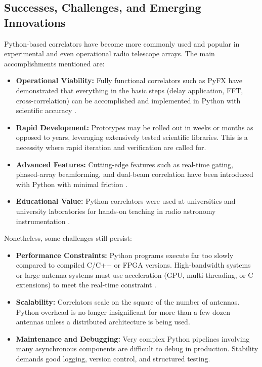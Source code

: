     \subsection{Successes, Challenges, and Emerging Innovations}
    Python-based correlators have become more commonly used and popular in experimental and even operational radio telescope arrays. The main accomplishments mentioned are:

    \begin{itemize}
        \item \textbf{Operational Viability:} Fully functional correlators such as PyFX have demonstrated that everything in the basic steps (delay application, FFT, cross-correlation) can be accomplished and implemented in Python with scientific accuracy \cite{Leung2024}.
        
        \item \textbf{Rapid Development:} Prototypes may be rolled out in weeks or months as opposed to years, leveraging extensively tested scientific libraries. This is a necessity where rapid iteration and verification are called for.

        \item \textbf{Advanced Features:} Cutting-edge features such as real-time gating, phased-array beamforming, and dual-beam correlation have been introduced with Python with minimal friction \cite{Leung2024}.

        \item \textbf{Educational Value:} Python correlators were used at universities and university laboratories for hands-on teaching in radio astronomy instrumentation \cite{Gorthi2021}.
    \end{itemize}

    Nonetheless, some challenges still persist:
    
    \begin{itemize}
        \item \textbf{Performance Constraints:} Python programs execute far too slowly compared to compiled C/C++ or FPGA versions. High-bandwidth systems or large antenna systems must use acceleration (GPU, multi-threading, or C extensions) to meet the real-time constraint \cite{Merry2023}.
        
        \item \textbf{Scalability:} Correlators scale on the square of the number of antennas. Python overhead is no longer insignificant for more than a few dozen antennas unless a distributed architecture is being used.

        \item \textbf{Maintenance and Debugging:} Very complex Python pipelines involving many asynchronous components are difficult to debug in production. Stability demands good logging, version control, and structured testing.
    \end{itemize}

